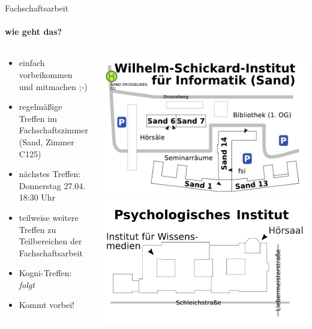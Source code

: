 \documentclass{beamer}
\begin{document}
	\begin{frame}{Fachschaftsarbeit}
		\framesubtitle{wie geht das?}
		\begin{columns}
			\begin{column}{.5\linewidth}
				\begin{itemize}
					\item einfach vorbeikommen und mitmachen ;-)
					\item regelmäßige Treffen im Fachschaftszimmer (Sand, Zimmer C125)
					\item nächstes Treffen: \\Donnerstag 27.04. 18:30 Uhr
					\item teilweise weitere Treffen zu Teilbereichen der Fachschaftsarbeit
					\item Kogni-Treffen: \emph{folgt}
					\item Kommt vorbei!
				\end{itemize}
			\end{column}
			\begin{column}{0.5\linewidth}
				\includegraphics[width=\linewidth]{pictures/uebersicht_sand.pdf}\\
				\includegraphics[width=\linewidth]{pictures/uebersicht_pi.pdf}\\
			\end{column}
		\end{columns}
	\end{frame}
	
\end{document}
